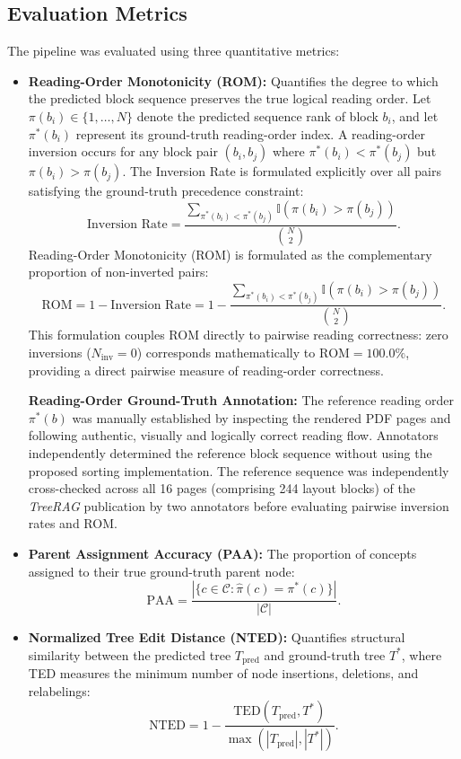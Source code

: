 \documentclass[12pt,a4paper]{report}
\begin{document}
\subsection{Evaluation Metrics}
The pipeline was evaluated using three quantitative metrics:
\begin{itemize}
    \item \textbf{Reading-Order Monotonicity (ROM):} Quantifies the degree to which the predicted block sequence preserves the true logical reading order. Let $\pi(b_i) \in \{1, \dots, N\}$ denote the predicted sequence rank of block $b_i$, and let $\pi^*(b_i)$ represent its ground-truth reading-order index. A reading-order inversion occurs for any block pair $(b_i, b_j)$ where $\pi^*(b_i) < \pi^*(b_j)$ but $\pi(b_i) > \pi(b_j)$. The Inversion Rate is formulated explicitly over all pairs satisfying the ground-truth precedence constraint:
    \begin{equation}
    \text{Inversion Rate} = \frac{\sum_{\pi^*(b_i) < \pi^*(b_j)} \mathbb{I}(\pi(b_i) > \pi(b_j))}{\binom{N}{2}}.
    \label{eq:inversion_rate}
    \end{equation}
    Reading-Order Monotonicity (ROM) is formulated as the complementary proportion of non-inverted pairs:
    \begin{equation}
    \text{ROM} = 1 - \text{Inversion Rate} = 1 - \frac{\sum_{\pi^*(b_i) < \pi^*(b_j)} \mathbb{I}(\pi(b_i) > \pi(b_j))}{\binom{N}{2}}.
    \label{eq:rom_metric}
    \end{equation}
    This formulation couples ROM directly to pairwise reading correctness: zero inversions ($N_{\text{inv}} = 0$) corresponds mathematically to $\text{ROM} = 100.0\%$, providing a direct pairwise measure of reading-order correctness.

    \noindent\textbf{Reading-Order Ground-Truth Annotation:} The reference reading order $\pi^*(b)$ was manually established by inspecting the rendered PDF pages and following authentic, visually and logically correct reading flow. Annotators independently determined the reference block sequence without using the proposed sorting implementation. The reference sequence was independently cross-checked across all 16 pages (comprising 244 layout blocks) of the \textit{TreeRAG} publication by two annotators before evaluating pairwise inversion rates and ROM.
    \item \textbf{Parent Assignment Accuracy (PAA):} The proportion of concepts assigned to their true ground-truth parent node:
    \begin{equation}
    \text{PAA} = \frac{|\{c \in \mathcal{C} : \hat{\pi}(c) = \pi^*(c)\}|}{|\mathcal{C}|}.
    \end{equation}
    \item \textbf{Normalized Tree Edit Distance (NTED):} Quantifies structural similarity between the predicted tree $T_{\text{pred}}$ and ground-truth tree $T^*$, where TED \cite{bille2005survey} measures the minimum number of node insertions, deletions, and relabelings:
    \begin{equation}
    \text{NTED} = 1 - \frac{\text{TED}(T_{\text{pred}}, T^*)}{\max(|T_{\text{pred}}|, |T^*|)}.
    \end{equation}
\end{itemize}
\end{document}

